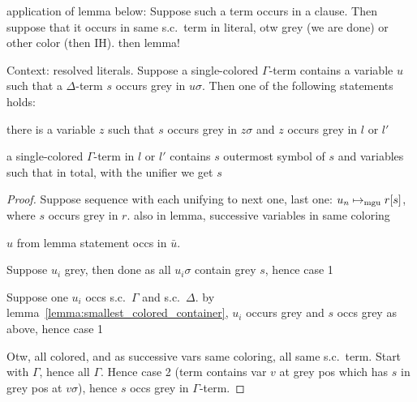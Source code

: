 \documentclass[,%
	paper=a4,%
	DIV11, %
	twoside=false,%
	liststotoc,
	bibtotoc,
	draft=false,%
	numbers=noendperiod
]{scrartcl}
\begin{document}
application of lemma below:
Suppose such a term occurs in a clause. Then suppose that it occurs in same s.c.\ term in literal, otw grey (we are done) or other color (then IH). then lemma!

\begin{lemma}
	\label{lemma:u_sigma_contains_delta_term}
	Context: resolved literals.
	Suppose a single-colored $\Gamma$-term contains a variable $u$ such that a $\Delta$-term $s$ occurs grey in $u\sigma$.
	Then one of the following statements holds:
	\begin{compactenum}
	\item there is a variable $z$ such that $s$ occurs grey in $z\sigma$ and $z$ occurs grey in $l$ or $l'$ 
	\item a single-colored $\Gamma$-term in $l$ or $l'$ contains $s$ outermost symbol of $s$ and variables such that in total, with the unifier we get $s$
	\end{compactenum}
\end{lemma}
\begin{proof}
	Suppose sequence with each unifying to next one, last one: $u_n \mapsto_{\operatorname{mgu}} r[s]$, where $s$ occurs grey in $r$.
	also in lemma, successive variables in same coloring

	$u$ from lemma statement occs in $\bar u$. 	

	Suppose $u_i$ grey, then done as all $u_i\sigma$ contain grey $s$, hence case 1

	Suppose one $u_i$ occs s.c.\ $\Gamma$ and  s.c.\ $\Delta$. by lemma~\ref{lemma:smallest_colored_container}, $u_i$ occurs grey and $s$ occs grey as above, hence case 1

	Otw, all colored, and as successive vars same coloring, all same s.c.\ term.
	Start with $\Gamma$, hence all $\Gamma$. 
	Hence case 2 (term contains var $v$ at grey pos which has $s$ in grey pos at $v\sigma$), hence $s$ occs grey in $\Gamma$-term.



\end{proof}
\end{document}
